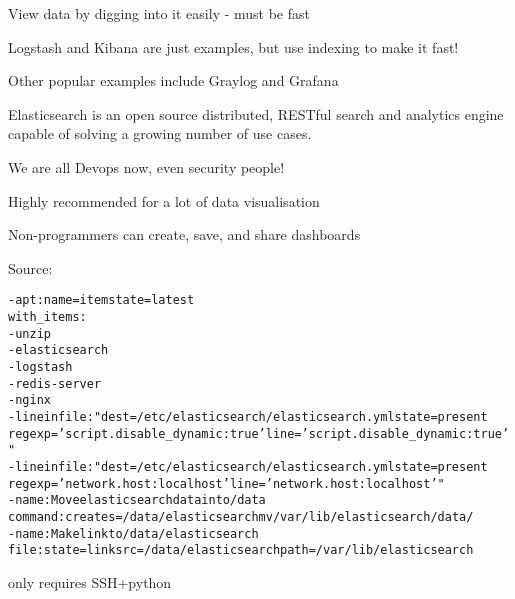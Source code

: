 \documentclass[Screen16to9,17pt]{foils}
\begin{document}


\begin{list1}
\item View data by digging into it easily - must be fast
\item Logstash and Kibana are just examples, but use indexing to make it fast!
\item Other popular examples include Graylog and Grafana
\end{list1}



Elasticsearch is an open source distributed, RESTful search and analytics engine capable of solving a growing number of use cases.


\vskip 1cm
\centerline{We are all Devops now, even security people!}




\centerline{Highly recommended for a lot of data visualisation}

Non-programmers can create, save, and share dashboards

Source:



\begin{alltt}\small
- apt: name={{ item }} state=latest
  with_items:
        - unzip
        - elasticsearch
        - logstash
        - redis-server
        - nginx
- lineinfile: "dest=/etc/elasticsearch/elasticsearch.yml state=present
  regexp='script.disable_dynamic: true' line='script.disable_dynamic: true'"
- lineinfile: "dest=/etc/elasticsearch/elasticsearch.yml state=present
  regexp='network.host: localhost' line='network.host: localhost'"
- name: Move elasticsearch data into /data
  command: creates=/data/elasticsearch mv /var/lib/elasticsearch /data/
- name: Make link to /data/elasticsearch
  file: state=link src=/data/elasticsearch path=/var/lib/elasticsearch
\end{alltt}
\vskip 5mm
\centerline{only requires SSH+python }

\end{document}
